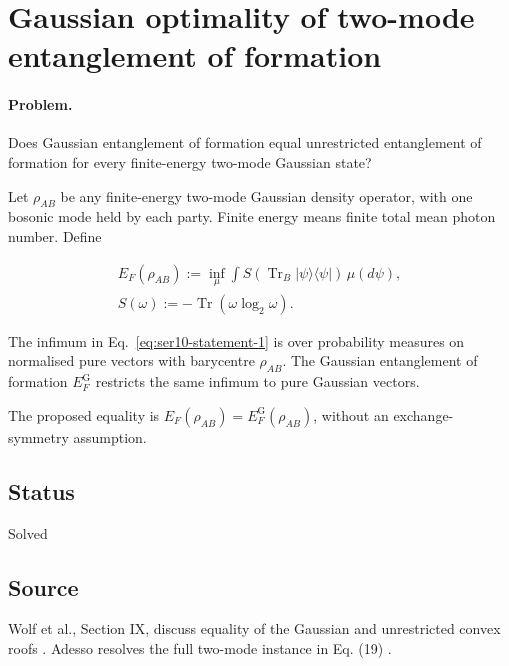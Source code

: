 \section{Gaussian optimality of two-mode entanglement of formation}
\label{sec:op_cb7cdf37ec9b9ec5}

\paragraph{Problem.}
Does Gaussian entanglement of formation equal unrestricted entanglement of formation for every finite-energy two-mode Gaussian state?

Let $\rho_{AB}$ be any finite-energy two-mode Gaussian density operator, with one bosonic mode held by each party. Finite energy means finite total mean photon number. Define

\begin{equation}
\begin{gathered}
E_F(\rho_{AB}):=\inf_\mu\int S(\operatorname{Tr}_B|\psi\rangle\langle\psi|)\,\mu(d\psi),
\\
S(\omega):=-\operatorname{Tr}(\omega\log_2\omega).
\end{gathered}
\label{eq:ser10-statement-1}
\end{equation}

The infimum in Eq.~\eqref{eq:ser10-statement-1} is over probability measures on normalised pure vectors with barycentre $\rho_{AB}$. The Gaussian entanglement of formation $E_F^{\mathrm G}$ restricts the same infimum to pure Gaussian vectors.

The proposed equality is $E_F(\rho_{AB})=E_F^{\mathrm G}(\rho_{AB})$, without an exchange-symmetry assumption.

\subsection*{Status}

Solved

\subsection*{Source}

Wolf et al., Section IX, discuss equality of the Gaussian and unrestricted convex roofs . Adesso resolves the full two-mode instance in Eq. (19) .

